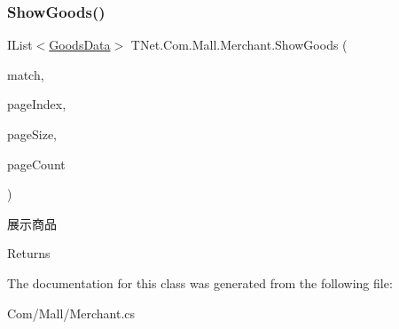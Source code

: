 \subsubsection{\texorpdfstring{Show\+Goods()}{ShowGoods()}}
{\footnotesize\ttfamily I\+List$<$\mbox{\hyperlink{class_t_net_1_1_com_1_1_model_1_1_goods_data}{Goods\+Data}}$>$ T\+Net.\+Com.\+Mall.\+Merchant.\+Show\+Goods (\begin{DoxyParamCaption}\item[{Predicate$<$ \mbox{\hyperlink{class_t_net_1_1_com_1_1_model_1_1_goods_data}{Goods\+Data}} $>$}]{match,  }\item[{int}]{page\+Index,  }\item[{int}]{page\+Size,  }\item[{out int}]{page\+Count }\end{DoxyParamCaption})}



展示商品 

\begin{DoxyReturn}{Returns}

\end{DoxyReturn}


The documentation for this class was generated from the following file\+:\begin{DoxyCompactItemize}
\item 
Com/\+Mall/Merchant.\+cs\end{DoxyCompactItemize}
